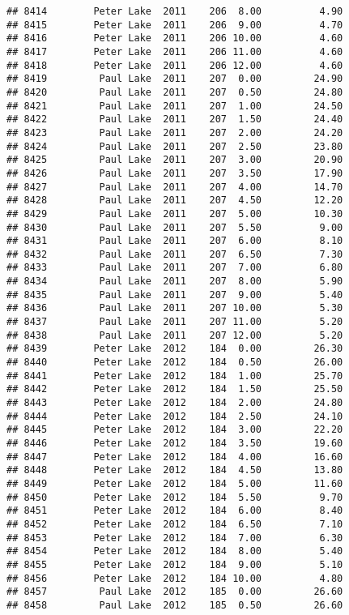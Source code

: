 \documentclass[
]{article}
\begin{document}
\begin{verbatim}
## 8414        Peter Lake  2011    206  8.00          4.90
## 8415        Peter Lake  2011    206  9.00          4.70
## 8416        Peter Lake  2011    206 10.00          4.60
## 8417        Peter Lake  2011    206 11.00          4.60
## 8418        Peter Lake  2011    206 12.00          4.60
## 8419         Paul Lake  2011    207  0.00         24.90
## 8420         Paul Lake  2011    207  0.50         24.80
## 8421         Paul Lake  2011    207  1.00         24.50
## 8422         Paul Lake  2011    207  1.50         24.40
## 8423         Paul Lake  2011    207  2.00         24.20
## 8424         Paul Lake  2011    207  2.50         23.80
## 8425         Paul Lake  2011    207  3.00         20.90
## 8426         Paul Lake  2011    207  3.50         17.90
## 8427         Paul Lake  2011    207  4.00         14.70
## 8428         Paul Lake  2011    207  4.50         12.20
## 8429         Paul Lake  2011    207  5.00         10.30
## 8430         Paul Lake  2011    207  5.50          9.00
## 8431         Paul Lake  2011    207  6.00          8.10
## 8432         Paul Lake  2011    207  6.50          7.30
## 8433         Paul Lake  2011    207  7.00          6.80
## 8434         Paul Lake  2011    207  8.00          5.90
## 8435         Paul Lake  2011    207  9.00          5.40
## 8436         Paul Lake  2011    207 10.00          5.30
## 8437         Paul Lake  2011    207 11.00          5.20
## 8438         Paul Lake  2011    207 12.00          5.20
## 8439        Peter Lake  2012    184  0.00         26.30
## 8440        Peter Lake  2012    184  0.50         26.00
## 8441        Peter Lake  2012    184  1.00         25.70
## 8442        Peter Lake  2012    184  1.50         25.50
## 8443        Peter Lake  2012    184  2.00         24.80
## 8444        Peter Lake  2012    184  2.50         24.10
## 8445        Peter Lake  2012    184  3.00         22.20
## 8446        Peter Lake  2012    184  3.50         19.60
## 8447        Peter Lake  2012    184  4.00         16.60
## 8448        Peter Lake  2012    184  4.50         13.80
## 8449        Peter Lake  2012    184  5.00         11.60
## 8450        Peter Lake  2012    184  5.50          9.70
## 8451        Peter Lake  2012    184  6.00          8.40
## 8452        Peter Lake  2012    184  6.50          7.10
## 8453        Peter Lake  2012    184  7.00          6.30
## 8454        Peter Lake  2012    184  8.00          5.40
## 8455        Peter Lake  2012    184  9.00          5.10
## 8456        Peter Lake  2012    184 10.00          4.80
## 8457         Paul Lake  2012    185  0.00         26.60
## 8458         Paul Lake  2012    185  0.50         26.60

\end{verbatim}
\end{document}
